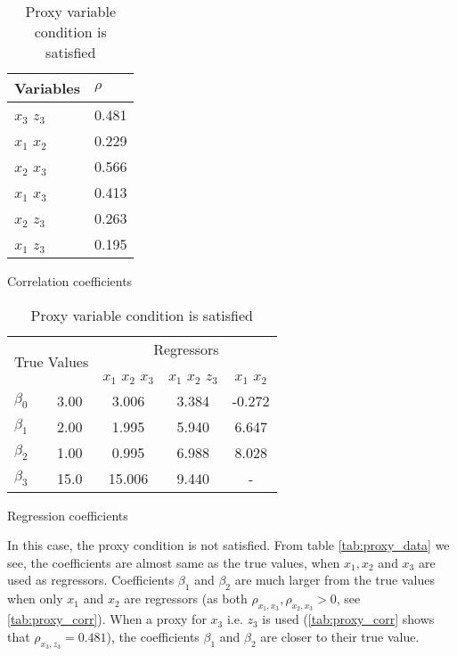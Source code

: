 \begin{table}[htbp]
    \begin{minipage}[t]{0.45\textwidth}
        \centering
        \begin{tabular}{ll}
            \toprule
            Variables & $\rho$ \\
            \midrule
            $x_3$ $z_3$ & 0.481 \\
            $x_1$ $x_2$ & 0.229 \\
            \hline
            $x_2$ $x_3$ & 0.566 \\
            $x_1$ $x_3$ & 0.413 \\
            \hline
            $x_2$ $z_3$ & 0.263 \\
            $x_1$ $z_3$ & 0.195 \\
            \bottomrule
        \end{tabular}
        \caption{Correlation coefficients}
        \label{tab:proxy_corr}
    \end{minipage}%
    \begin{minipage}[t]{0.45\textwidth}
        \centering
        \begin{tabular}{lcccc} %
            \toprule
            \multicolumn{2}{c}{\multirow{2}{*}{True Values}} & \multicolumn{3}{c}{Regressors} \\
            \cmidrule(lr){3-5}
            \multicolumn{2}{c}{} & $x_1$ $x_2$ $x_3$ & $x_1$ $x_2$ $z_3$ & $x_1$ $x_2$ \\
            \midrule
            $\beta_0$ & 3.00 & 3.006 & 3.384 & -0.272 \\
            $\beta_1$ & 2.00 & 1.995 & 5.940 & 6.647 \\
            $\beta_2$ & 1.00 & 0.995 & 6.988 & 8.028 \\
            $\beta_3$ & 15.0 & 15.006 & 9.440 & - \\
            \bottomrule
        \end{tabular}
          \caption{Regression coefficients}
          \label{tab:proxy_data}
    \end{minipage}
    \caption{Proxy variable condition is satisfied}
    
\end{table}


In this case, the proxy condition is not satisfied. From table \autoref{tab:proxy_data} we see, the coefficients are almost same as the true values, when $x_1 , x_2$ and $x_3$ are used as regressors. Coefficients $\beta_1$ and $\beta_2$ are much larger from the true values when only $x_1$ and $x_2$ are regressors (as both $\rho_{x_1 , x_3} , \rho_{x_2 , x_3} > 0$, see \autoref{tab:proxy_corr}{}). When a proxy for $x_3$ i.e. $z_3$ is used (\autoref{tab:proxy_corr} shows that $\rho_{x_3 , z_3} = 0.481$), the coefficients $\beta_1$ and $\beta_2$ are closer to their true value.


